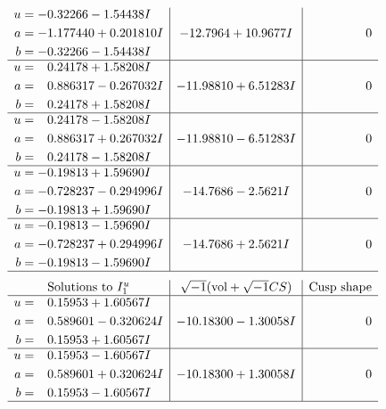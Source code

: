 \documentclass[1p]{elsarticle_modified}
\theoremstyle{definition}
\newcommand{\I}{\sqrt{-1}}
\begin{document}
$$\begin{array}{c|c|c}
\begin{aligned}
u &= -0.32266 - 1.54438 I \\
a &= -1.177440 + 0.201810 I \\
b &= -0.32266 - 1.54438 I\end{aligned}
 & -12.7964 + 10.9677 I & \phantom{-0.000000 } 0 \\ \hline\begin{aligned}
u &= \phantom{-}0.24178 + 1.58208 I \\
a &= \phantom{-}0.886317 - 0.267032 I \\
b &= \phantom{-}0.24178 + 1.58208 I\end{aligned}
 & -11.98810 + 6.51283 I & \phantom{-0.000000 } 0 \\ \hline\begin{aligned}
u &= \phantom{-}0.24178 - 1.58208 I \\
a &= \phantom{-}0.886317 + 0.267032 I \\
b &= \phantom{-}0.24178 - 1.58208 I\end{aligned}
 & -11.98810 - 6.51283 I & \phantom{-0.000000 } 0 \\ \hline\begin{aligned}
u &= -0.19813 + 1.59690 I \\
a &= -0.728237 - 0.294996 I \\
b &= -0.19813 + 1.59690 I\end{aligned}
 & -14.7686 - 2.5621 I & \phantom{-0.000000 } 0 \\ \hline\begin{aligned}
u &= -0.19813 - 1.59690 I \\
a &= -0.728237 + 0.294996 I \\
b &= -0.19813 - 1.59690 I\end{aligned}
 & -14.7686 + 2.5621 I & \phantom{-0.000000 } 0\\
 \hline 
 \end{array}$$\newpage$$\begin{array}{c|c|c}  
\text{Solutions to }I^u_{1}& \I (\text{vol} + \sqrt{-1}CS) & \text{Cusp shape}\\
 \hline 
\begin{aligned}
u &= \phantom{-}0.15953 + 1.60567 I \\
a &= \phantom{-}0.589601 - 0.320624 I \\
b &= \phantom{-}0.15953 + 1.60567 I\end{aligned}
 & -10.18300 - 1.30058 I & \phantom{-0.000000 } 0 \\ \hline\begin{aligned}
u &= \phantom{-}0.15953 - 1.60567 I \\
a &= \phantom{-}0.589601 + 0.320624 I \\
b &= \phantom{-}0.15953 - 1.60567 I\end{aligned}
 & -10.18300 + 1.30058 I & \phantom{-0.000000 } 0\\
 \hline 
 \end{array}$$\newpage\newpage\renewcommand{\arraystretch}{1}
\end{document}
